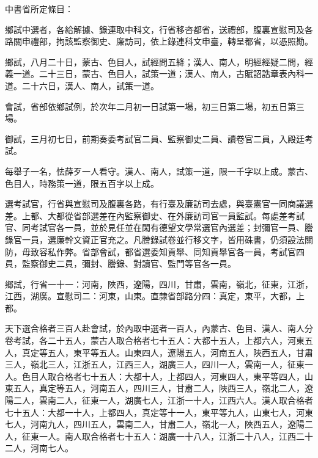\begin{pinyinscope}
 中書省所定條目：



 鄉試中選者，各給解據、錄連取中科文，行省移咨都省，送禮部，腹裏宣慰司及各路關申禮部，拘該監察御史、廉訪司，依上錄連科文申臺，轉呈都省，以憑照勘。



 鄉試，八月二十日，蒙古、色目人，試經問五絳；漢人、南人，明經經疑二問，經義一道。二十三日，蒙古、色目人，試策一道；漢人、南人，古賦詔誥章表內科一道。二十六日，漢人、南人，試策一道。



 會試，省部依鄉試例，於次年二月初一日試第一場，初三日第二場，初五日第三場。



 御試，三月初七日，前期奏委考試官二員、監察御史二員、讀卷官二員，入殿廷考試。



 每舉子一名，怯薛歹一人看守。漢人、南人，試策一道，限一千字以上成。蒙古、色目人，時務策一道，限五百字以上成。



 選考試官，行省與宣慰司及腹裏各路，有行臺及廉訪司去處，與臺憲官一同商議選差。上都、大都從省部選差在內監察御史、在外廉訪司官一員監試。每處差考試官、同考試官各一員，並於見任並在閑有德望文學常選官內選差；封彌官一員、謄錄官一員，選廉幹文資正官充之。凡謄錄試卷並行移文字，皆用硃書，仍須設法關防，毋致容私作弊。省部會試，都省選委知貢舉、同知貢舉官各一員，考試官四員，監察御史二員，彌封、謄錄、對讀官、監門等官各一員。



 鄉試，行省一十一：河南，陜西，遼陽，四川，甘肅，雲南，嶺北，征東，江浙，江西，湖廣。宣慰司二：河東，山東。直隸省部路分四：真定，東平，大都，上都。



 天下選合格者三百人赴會試，於內取中選者一百人，內蒙古、色目、漢人、南人分卷考試，各二十五人，蒙古人取合格者七十五人：大都十五人，上都六人，河東五人，真定等五人，東平等五人。山東四人，遼陽五人，河南五人，陜西五人，甘肅三人，嶺北三人，江浙五人，江西三人，湖廣三人，四川一人，雲南一人，征東一人。色目人取合格者七十五人：大都十人，上都四人，河東四人，東平等四人，山東五人，真定等五人，河南五人，四川三人，甘肅二人，陜西三人，嶺北二人，遼陽二人，雲南二人，征東一人，湖廣七人，江浙一十人，江西六人。漢人取合格者七十五人：大都一十人，上都四人，真定等十一人，東平等九人，山東七人，河東七人，河南九人，四川五人，雲南二人，甘肅二人，嶺北一人，陜西五人，遼陽二人，征東一人。南人取合格者七十五人：湖廣一十八人，江浙二十八人，江西二十二人，河南七人。




\end{pinyinscope}
